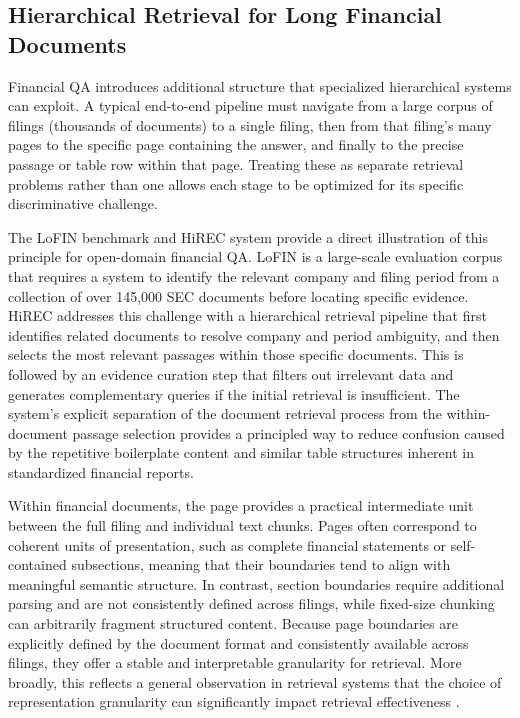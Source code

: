 \documentclass[12pt,twoside,maitrise]{dms}
\theoremstyle{definition}
\numberwithin{equation}{section}
\numberwithin{table}{chapter}
\numberwithin{figure}{chapter}
\begin{document}

\subsection{Hierarchical Retrieval for Long Financial Documents}

Financial QA introduces additional structure that specialized hierarchical systems can
exploit. A typical end-to-end pipeline must navigate from a large corpus of filings
(thousands of documents) to a single filing, then from that filing's many pages to the
specific page containing the answer, and finally to the precise passage or table row
within that page. Treating these as separate retrieval problems rather than one
allows each stage to be optimized for its specific discriminative challenge.

The LoFIN benchmark and HiREC system  provide a direct illustration of this principle for open-domain financial QA. LoFIN is a large-scale evaluation corpus that requires a system to identify the relevant company and filing period from a collection of over 145,000 SEC documents before locating specific evidence. HiREC addresses this challenge with a hierarchical retrieval pipeline that first identifies related documents to resolve company and period ambiguity, and then selects the most relevant passages within those specific documents. This is followed by an evidence curation step that filters out irrelevant data and generates complementary queries if the initial retrieval is insufficient. The system’s explicit separation of the document retrieval process from the within-document passage selection provides a principled way to reduce confusion caused by the repetitive boilerplate content and similar table structures inherent in standardized financial reports.

Within financial documents, the page provides a practical intermediate unit between
the full filing and individual text chunks. Pages often correspond to coherent
units of presentation, such as complete financial statements or self-contained
subsections, meaning that their boundaries tend to align with meaningful semantic
structure. In contrast, section boundaries require additional parsing and are not
consistently defined across filings, while fixed-size chunking can arbitrarily
fragment structured content. Because page boundaries are explicitly defined by the document format and
consistently available across filings, they offer a stable and interpretable
granularity for retrieval. More broadly, this reflects a general
observation in retrieval systems that the choice of representation granularity
can significantly impact retrieval effectiveness \citep{izacard2021leveraging, liu2024lost}.
\end{document}
